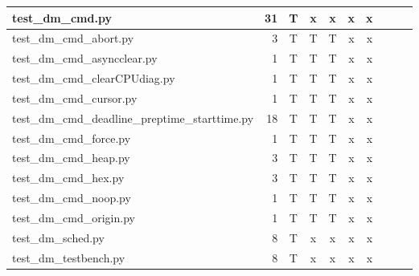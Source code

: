 \documentclass[12pt,a4paper]{report}
\begin{document}
\begin{table}
\begin{tabular}[t]{|l|r|c|c|c|c|c|c|c|c|}
test\_dm\_cmd.py                                &  31                 &   T        &   x             &   x           &   x              &   x                 \\ \hline
test\_dm\_cmd\_abort.py                         &  3                  &   T        &   T             &   T           &   x              &   x                 \\ \hline
test\_dm\_cmd\_asyncclear.py                    &  1                  &   T        &   T             &   T           &   x              &   x                 \\ \hline
test\_dm\_cmd\_clearCPUdiag.py                  &  1                  &   T        &   T             &   T           &   x              &   x                 \\ \hline
test\_dm\_cmd\_cursor.py                        &  1                  &   T        &   T             &   T           &   x              &   x                 \\ \hline
test\_dm\_cmd\_deadline\_preptime\_starttime.py &  18                 &   T        &   T             &   T           &   x              &   x                 \\ \hline
test\_dm\_cmd\_force.py                         &  1                  &   T        &   T             &   T           &   x              &   x                 \\ \hline
test\_dm\_cmd\_heap.py                          &  3                  &   T        &   T             &   T           &   x              &   x                 \\ \hline
 test\_dm\_cmd\_hex.py                          &  3                  &   T        &   T             &   T           &   x              &   x                 \\ \hline
test\_dm\_cmd\_noop.py                          &  1                  &   T        &   T             &   T           &   x              &   x                 \\ \hline
test\_dm\_cmd\_origin.py                        &  1                  &   T        &   T             &   T           &   x              &   x                 \\ \hline
test\_dm\_sched.py                              &  8                  &   T        &   x             &   x           &   x              &   x                 \\ \hline
test\_dm\_testbench.py                          &  8                  &   T        &   x             &   x           &   x              &   x                 \\ \hline

\end{tabular}
\end{table}
\end{document}

